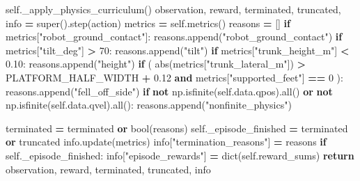 \documentclass[
  chinese,
  11pt,
  letterpaper,
]{article}
\newenvironment{Shaded}{\begin{snugshade}}{\end{snugshade}}
\newcommand{\BuiltInTok}[1]{#1}
\newcommand{\ControlFlowTok}[1]{\textcolor[rgb]{0.13,0.29,0.53}{\textbf{#1}}}
\newcommand{\DecValTok}[1]{\textcolor[rgb]{0.00,0.00,0.81}{#1}}
\newcommand{\FloatTok}[1]{\textcolor[rgb]{0.00,0.00,0.81}{#1}}
\newcommand{\KeywordTok}[1]{\textcolor[rgb]{0.13,0.29,0.53}{\textbf{#1}}}
\newcommand{\NormalTok}[1]{#1}
\newcommand{\OperatorTok}[1]{\textcolor[rgb]{0.81,0.36,0.00}{\textbf{#1}}}
\newcommand{\StringTok}[1]{\textcolor[rgb]{0.31,0.60,0.02}{#1}}
\newcommand{\VariableTok}[1]{\textcolor[rgb]{0.00,0.00,0.00}{#1}}
\renewenvironment{Shaded}{\par\smallskip}{\par\smallskip}
\begin{document}
\begin{Shaded}
\begin{Highlighting}[]
        \VariableTok{self}\NormalTok{.\_apply\_physics\_curriculum()}
\NormalTok{        observation, reward, terminated, truncated, info }\OperatorTok{=} \BuiltInTok{super}\NormalTok{().step(action)}
\NormalTok{        metrics }\OperatorTok{=} \VariableTok{self}\NormalTok{.metrics()}
\NormalTok{        reasons }\OperatorTok{=}\NormalTok{ []}
        \ControlFlowTok{if}\NormalTok{ metrics[}\StringTok{"robot\_ground\_contact"}\NormalTok{]:}
\NormalTok{            reasons.append(}\StringTok{"robot\_ground\_contact"}\NormalTok{)}
        \ControlFlowTok{if}\NormalTok{ metrics[}\StringTok{"tilt\_deg"}\NormalTok{] }\OperatorTok{\textgreater{}} \DecValTok{70}\NormalTok{:}
\NormalTok{            reasons.append(}\StringTok{"tilt"}\NormalTok{)}
        \ControlFlowTok{if}\NormalTok{ metrics[}\StringTok{"trunk\_height\_m"}\NormalTok{] }\OperatorTok{\textless{}} \FloatTok{0.10}\NormalTok{:}
\NormalTok{            reasons.append(}\StringTok{"height"}\NormalTok{)}
        \ControlFlowTok{if}\NormalTok{ (}
            \BuiltInTok{abs}\NormalTok{(metrics[}\StringTok{"trunk\_lateral\_m"}\NormalTok{]) }\OperatorTok{\textgreater{}}\NormalTok{ PLATFORM\_HALF\_WIDTH }\OperatorTok{+} \FloatTok{0.12}
            \KeywordTok{and}\NormalTok{ metrics[}\StringTok{"supported\_feet"}\NormalTok{] }\OperatorTok{==} \DecValTok{0}
\NormalTok{        ):}
\NormalTok{            reasons.append(}\StringTok{"fell\_off\_side"}\NormalTok{)}
        \ControlFlowTok{if} \KeywordTok{not}\NormalTok{ np.isfinite(}\VariableTok{self}\NormalTok{.data.qpos).}\BuiltInTok{all}\NormalTok{() }\KeywordTok{or} \KeywordTok{not}\NormalTok{ np.isfinite(}\VariableTok{self}\NormalTok{.data.qvel).}\BuiltInTok{all}\NormalTok{():}
\NormalTok{            reasons.append(}\StringTok{"nonfinite\_physics"}\NormalTok{)}

\NormalTok{        terminated }\OperatorTok{=}\NormalTok{ terminated }\KeywordTok{or} \BuiltInTok{bool}\NormalTok{(reasons)}
        \VariableTok{self}\NormalTok{.\_episode\_finished }\OperatorTok{=}\NormalTok{ terminated }\KeywordTok{or}\NormalTok{ truncated}
\NormalTok{        info.update(metrics)}
\NormalTok{        info[}\StringTok{"termination\_reasons"}\NormalTok{] }\OperatorTok{=}\NormalTok{ reasons}
        \ControlFlowTok{if} \VariableTok{self}\NormalTok{.\_episode\_finished:}
\NormalTok{            info[}\StringTok{"episode\_rewards"}\NormalTok{] }\OperatorTok{=} \BuiltInTok{dict}\NormalTok{(}\VariableTok{self}\NormalTok{.reward\_sums)}
        \ControlFlowTok{return}\NormalTok{ observation, reward, terminated, truncated, info}


\end{Highlighting}
\end{Shaded}
\end{document}
